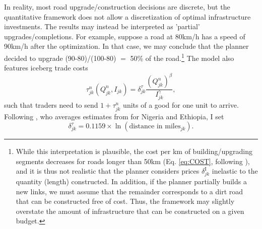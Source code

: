 \documentclass[a4paper]{article}
\begin{document}
 In reality, most road upgrade/construction decisions are discrete, but the quantitative framework does not allow a discretization of optimal infrastructure investments. The results may instead be interpreted as 'partial' upgrades/completions. For example, suppose a road at 80km/h has a speed of 90km/h after the optimization. In that case, we may conclude that the planner decided to upgrade (90-80)/(100-80) $=$ 50\% of the road.\footnote{While this interpretation is plausible, the cost per km of building/upgrading segments decreases for roads longer than 50km (Eq. \ref{eq:COST}, following \citet{collier2016cost}), and it is thus not realistic that the planner considers prices $\delta^\text{I}_{jk}$ inelastic to the quantity (length) constructed. In addition, if the planner partially builds a new links, we must assume that the remainder corresponds to a dirt road that can be constructed free of cost. Thus, the framework may slightly overstate the amount of infrastructure that can be constructed on a given budget.} The model also features iceberg trade costs
\begin{equation} \label{eq:delta_tau_real}
\tau_{jk}^n (Q^n_{jk}, I_{jk}) = \delta^\tau_{jk}\frac{(Q^n_{jk})^\beta}{I_{jk}^\gamma},
\end{equation} 
such that traders need to send $1+\tau_{jk}^n$ units of a good for one unit to arrive. Following \citet{graff2019spatial}, who averages estimates from \citet{atkin2015s} for Nigeria and Ethiopia, I set 
\begin{equation} \label{eq:delta_tau}
 \delta^\tau_{jk} = 0.1159 \times \ln(\text{distance in miles}_{jk}).
\end{equation}
\end{document}
